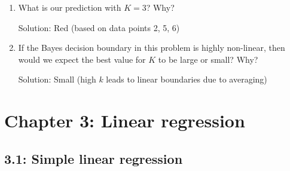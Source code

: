 \documentclass{article}
\begin{document}
\begin{enumerate}
\begin{enumerate}
Solution: Green (based on data point 5 only)

\item What is our prediction with $K = 3$? Why?

Solution: Red (based on data points 2, 5, 6)

\item If the Bayes decision boundary in this problem is highly non-linear, then
would we expect the best value for $K$ to be large or small? Why?

Solution: Small (high $k$ leads to linear boundaries due to averaging)
\end{enumerate}

\end{enumerate}

\section*{Chapter 3: Linear regression} 

\subsection*{3.1: Simple linear regression}
\end{document}
